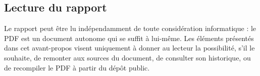 \subsection*{Lecture du rapport}

Le rapport peut être lu indépendamment de toute considération
informatique : le PDF est un document autonome qui se suffit à
lui-même. Les éléments présentés dans cet avant-propos visent
uniquement à donner au lecteur la possibilité, s'il le souhaite, de
remonter aux sources du document, de consulter son historique, ou de
recompiler le PDF à partir du dépôt public.

\clearpage

